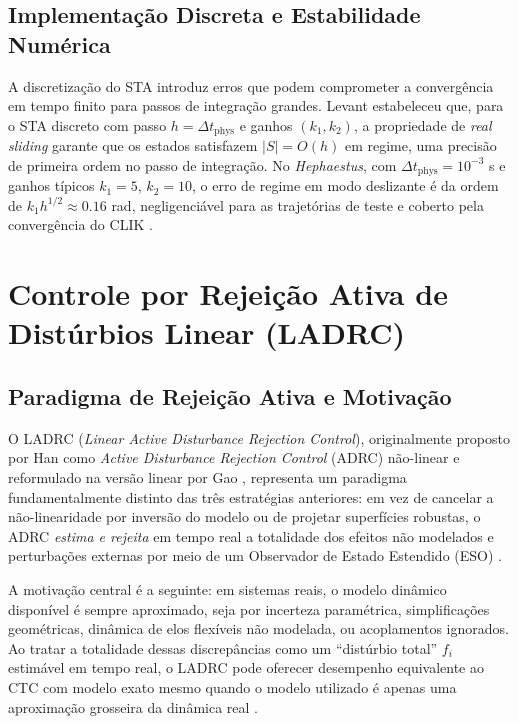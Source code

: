 \subsection{Implementação Discreta e Estabilidade Numérica}
\label{sec:sta_discreto}

A discretização do STA introduz erros que podem comprometer a convergência em tempo finito para passos de integração grandes. Levant \cite{levant2010chattering} estabeleceu que, para o STA discreto com passo $h = \Delta t_{\text{phys}}$ e ganhos $(k_1, k_2)$, a propriedade de \textit{real sliding} garante que os estados satisfazem $|S| = O(h)$ em regime, uma precisão de primeira ordem no passo de integração. No \textit{Hephaestus}, com $\Delta t_{\text{phys}} = 10^{-3}$ s e ganhos típicos $k_1 = 5$, $k_2 = 10$, o erro de regime em modo deslizante é da ordem de $k_1 h^{1/2} \approx 0.16$ rad, negligenciável para as trajetórias de teste e coberto pela convergência do CLIK \cite{levant2010chattering, shtessel2014sliding}.

\section{Controle por Rejeição Ativa de Distúrbios Linear (LADRC)}
\label{sec:ladrc_cap5}

\subsection{Paradigma de Rejeição Ativa e Motivação}

O LADRC (\textit{Linear Active Disturbance Rejection Control}), originalmente proposto por Han \cite{han1995class} como \textit{Active Disturbance Rejection Control} (ADRC) não-linear e reformulado na versão linear por Gao \cite{gao2003scaling}, representa um paradigma fundamentalmente distinto das três estratégias anteriores: em vez de cancelar a não-linearidade por inversão do modelo ou de projetar superfícies robustas, o ADRC \textit{estima e rejeita} em tempo real a totalidade dos efeitos não modelados e perturbações externas por meio de um Observador de Estado Estendido (ESO) \cite{han2009pid, huang2014active, gao2003scaling}.

A motivação central é a seguinte: em sistemas reais, o modelo dinâmico disponível é sempre aproximado, seja por incerteza paramétrica, simplificações geométricas, dinâmica de elos flexíveis não modelada, ou acoplamentos ignorados. Ao tratar a totalidade dessas discrepâncias como um ``distúrbio total'' $f_i$ estimável em tempo real, o LADRC pode oferecer desempenho equivalente ao CTC com modelo exato mesmo quando o modelo utilizado é apenas uma aproximação grosseira da dinâmica real \cite{han2009pid, gao2003scaling, zheng2010practical}.

